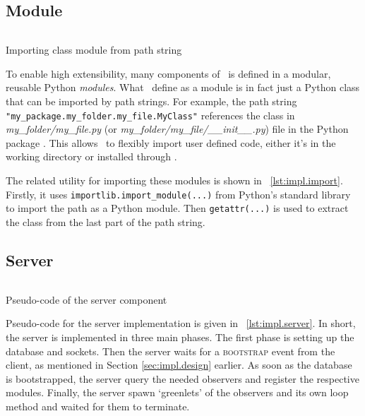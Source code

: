 \subsection{Module}

\begin{listing}
    \inputminted[firstline=31, lastline=34]{python}{assets/listings/reprobench/reprobench/utils.py}
    \caption{Importing class module from path string}
    \label{lst:impl.import}
\end{listing}


To enable high extensibility, many components of \OurBenchmarkingTool~is defined in a modular, reusable Python \emph{modules}.
What \first~define as a module is in fact just a Python class that can be imported by path strings.
For example, the path string \texttt{"my_package.my_folder.my_file.MyClass"} references the class  in \emph{my\_folder/my\_file.py} (or \emph{my\_folder/my\_file/\_\_init\_\_.py}) file in the Python package .
This allows \OurBenchmarkingTool~to flexibly import user defined code, either it's in the working directory or installed through .

The related utility for importing these modules is shown in \lst~\ref{lst:impl.import}.
Firstly, it uses \texttt{importlib.import_module(...)} from Python's standard library to import the path as a Python module.
Then \texttt{getattr(...)} is used to extract the class from the last part of the path string.

\subsection{Server}

\begin{listing}
    \inputminted{python}{assets/listings/pseudocodes/server.py}
    \caption{Pseudo-code of the server component}
    \label{lst:impl.server}
\end{listing}

Pseudo-code for the server implementation is given in \lst~\ref{lst:impl.server}.
In short, the server is implemented in three main phases.
The first phase is setting up the database and sockets.
Then the server waits for a \textsc{bootstrap} event from the client, as mentioned in Section \ref{sec:impl.design} earlier.
As soon as the database is bootstrapped, the server query the needed observers and register the respective modules.
Finally, the server spawn `greenlets' of the observers and its own loop method and waited for them to terminate.

